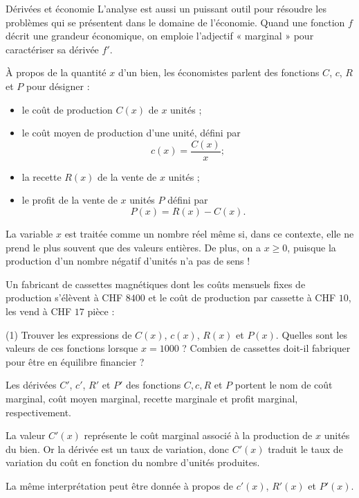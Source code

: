 \documentclass[a4paper,12pt]{article}
\begin{document}
\begin{activite}{Dérivées et économie}
\tcblower
L’analyse est aussi un puissant outil pour résoudre les problèmes qui se présentent dans le domaine de l’économie. Quand une fonction \(f\) décrit une grandeur économique, on emploie l’adjectif « marginal » pour caractériser sa dérivée \(f'\).

À propos de la quantité \(x\) d’un bien, les économistes parlent des fonctions \(C\), \(c\), \(R\) et \(P\) pour désigner :
\begin{itemize}
  \item le coût de production \(C(x)\) de \(x\) unités ;
  \item le coût moyen de production d’une unité, défini par 
  \[
    c(x)=\dfrac{C(x)}{x};
  \]
  \item la recette \(R(x)\) de la vente de \(x\) unités ;
  \item le profit de la vente de \(x\) unités \(P\) défini par 
  \[
    P(x)=R(x)-C(x).
  \]
\end{itemize}

La variable \(x\) est traitée comme un nombre réel même si, dans ce contexte, elle ne prend le plus souvent que des valeurs entières. De plus, on a \(x\ge0\), puisque la production d’un nombre négatif d’unités n’a pas de sens !

Un fabricant de cassettes magnétiques dont les coûts mensuels fixes de production s’élèvent à CHF $8400$ et le coût de production par cassette à CHF $10$, les vend à CHF $17$ pièce :

\begin{tasks}(1)
  \task Trouver les expressions de \(C(x)\), \(c(x)\), \(R(x)\) et \(P(x)\).
  \task Quelles sont les valeurs de ces fonctions lorsque \(x=1000\) ?
  \task Combien de cassettes doit-il fabriquer pour être en équilibre financier ?
\end{tasks}

Les dérivées \(C'\), \(c'\), \(R'\) et \(P'\) des fonctions \(C,c,R\) et \(P\) portent le nom de coût marginal, coût moyen marginal, recette marginale et profit marginal, respectivement.

La valeur \(C'(x)\) représente le coût marginal associé à la production de \(x\) unités du bien. Or la dérivée est un taux de variation, donc \(C'(x)\) traduit le taux de variation du coût en fonction du nombre d’unités produites.

La même interprétation peut être donnée à propos de \(c'(x)\), \(R'(x)\) et \(P'(x)\).


\end{activite}
\end{document}
